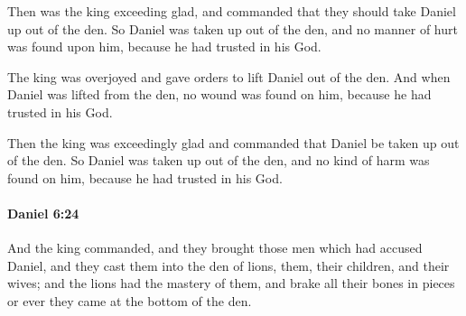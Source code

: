 			\begin{versebox}
					\item[BHS] 
					\item[LXX] 
					\item[ASV] Then was the king exceeding glad, and commanded that they should take Daniel up out of the den. So Daniel was taken up out of the den, and no manner of hurt was found upon him, because he had trusted in his God.
					\item[NIV] The king was overjoyed and gave orders to lift Daniel out of the den. And when Daniel was lifted from the den, no wound was found on him, because he had trusted in his God.
					\item[NRSV] Then the king was exceedingly glad and commanded that Daniel be taken up out of the den. So Daniel was taken up out of the den, and no kind of harm was found on him, because he had trusted in his God.
			\end{versebox}

		\paragraph{Daniel 6:24} %
			\label{DANIEL-6-24}

			And the king commanded, and they brought those men which had accused Daniel, and they cast them into the den of lions, them, their children, and their wives; and the lions had the mastery of them, and brake all their bones in pieces or ever they came at the bottom of the den.

